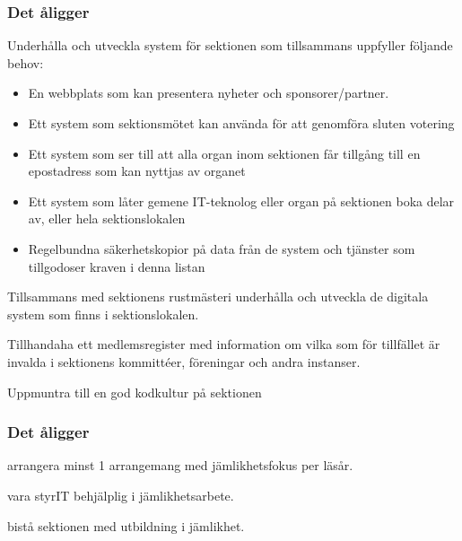 \subsubsection{Det åligger \DIGIT}
\begin{att}
	\item Underhålla och utveckla system för sektionen som tillsammans uppfyller följande behov:
	\begin{itemize}
		\item En webbplats som kan presentera nyheter och sponsorer/partner.
		\item Ett system som sektionsmötet kan använda för att genomföra sluten votering
		\item Ett system som ser till att alla organ inom sektionen får tillgång till en epostadress som kan nyttjas av organet
		\item Ett system som låter gemene IT-teknolog eller organ på sektionen boka delar av, eller hela sektionslokalen
		\item Regelbundna säkerhetskopior på data från de system och tjänster som tillgodoser kraven i denna listan
	\end{itemize}
	\item Tillsammans med sektionens rustmästeri underhålla och utveckla de digitala system som finns i sektionslokalen.
	\item Tillhandaha ett medlemsregister med information om vilka som för tillfället är invalda i sektionens kommittéer, föreningar och andra instanser.
	\item Uppmuntra till en god kodkultur på sektionen
\end{att}

\subsubsection{Det åligger \EQUALIT{}}
\begin{att}
    \item arrangera minst 1 arrangemang med jämlikhetsfokus per läsår.
    \item vara styrIT behjälplig i jämlikhetsarbete.
    \item bistå sektionen med utbildning i jämlikhet.
\end{att}

